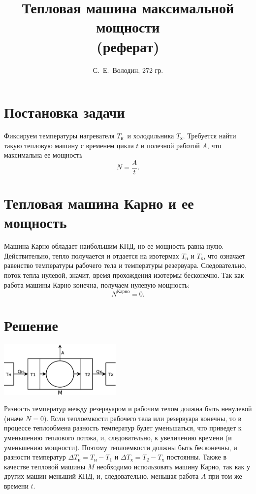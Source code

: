 \documentclass[a4paper]{article}
\title{Тепловая машина максимальной мощности\\(реферат)}
\author{С.~Е.~Володин, 272 гр.}
\date{}
\newcommand{\Tx}{$T_\text{х}$}
\newcommand{\Tn}{$T_\text{н}$}
\begin{document}
\maketitle
\section{Постановка задачи}
Фиксируем температуры нагревателя \Tn\ и холодильника \Tx. Требуется найти такую тепловую машину с временем цикла $t$ и полезной работой $A$, что максимальна ее мощность
$$
N=\frac{A}{t}.
$$
\section{Тепловая машина Карно и ее мощность}
Машина Карно обладает наибольшим КПД, но ее мощность равна нулю. Действительно, тепло получается и отдается на изотермах $T_{\text{н}}$ и $T_{\text{х}}$, что означает равенство температуры рабочего тела и температуры резервуара. Следовательно, поток тепла нулевой, значит, время прохождения изотермы бесконечно. Так как работа машины Карно конечна, получаем нулевую мощность:
$$
N^{\text{Карно}}=0.
$$
\section{Решение}
\begin{floatingfigure}[l]{7cm}
\includegraphics[width=6cm]{maxN}
\end{floatingfigure}
Разность температур между резервуаром и рабочим телом должна быть ненулевой (иначе $N=0$).\newline
Если теплоемкости рабочего тела или резервуара конечны, то в процессе теплообмена разность температур будет уменьшаться, что приведет к уменьшению теплового потока, и, следовательно, к увеличению времени (и уменьшению мощности). Поэтому теплоемкости должны быть бесконечны, и разности температур $\Delta T_\text{н}=T_\text{н}-T_1$ и $\Delta T_\text{х}=T_2-T_\text{х}$ постоянны.\newline
Также в качестве тепловой машины $M$ необходимо использовать машину Карно, так как у других машин меньший КПД, и, следовательно, меньшая работа $A$ при том же времени $t$.
\end{document}
